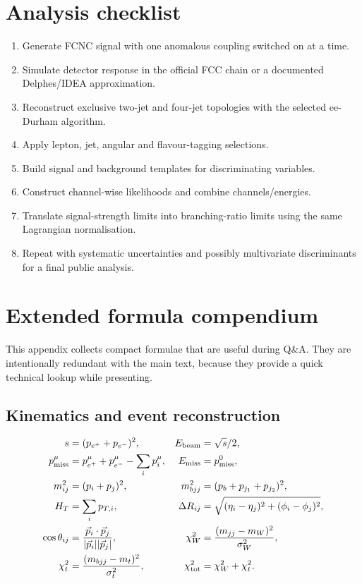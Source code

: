 \documentclass[11pt,a4paper]{report}
\begin{document}
\chapter{Analysis checklist}
\begin{enumerate}
\item Generate FCNC signal with one anomalous coupling switched on at a time.
\item Simulate detector response in the official FCC chain or a documented Delphes/IDEA approximation.
\item Reconstruct exclusive two-jet and four-jet topologies with the selected ee-Durham algorithm.
\item Apply lepton, jet, angular and flavour-tagging selections.
\item Build signal and background templates for discriminating variables.
\item Construct channel-wise likelihoods and combine channels/energies.
\item Translate signal-strength limits into branching-ratio limits using the same Lagrangian normalisation.
\item Repeat with systematic uncertainties and possibly multivariate discriminants for a final public analysis.
\end{enumerate}


\chapter{Extended formula compendium}
This appendix collects compact formulae that are useful during Q\&A.  They are intentionally redundant with the main text, because they provide a quick technical lookup while presenting.
\section{Kinematics and event reconstruction}
\begin{align}
s&=(p_{e^+}+p_{e^-})^2, & E_{\rm beam}&=\sqrt{s}/2,\\
p_{\rm miss}^\mu&=p_{e^+}^\mu+p_{e^-}^\mu-\sum_i p_i^\mu, & E_{\rm miss}&=p_{\rm miss}^0,\\
m_{ij}^2&=(p_i+p_j)^2, & m_{bjj}^2&=(p_b+p_{j_1}+p_{j_2})^2,\\
H_T&=\sum_i p_{T,i}, & \Delta R_{ij}&=\sqrt{(\eta_i-\eta_j)^2+(\phi_i-\phi_j)^2},\\
\cos\theta_{ij}&=\frac{\vec p_i\cdot\vec p_j}{|\vec p_i||\vec p_j|}, & \chi^2_W&=\frac{(m_{jj}-m_W)^2}{\sigma_W^2},\\
\chi^2_t&=\frac{(m_{bjj}-m_t)^2}{\sigma_t^2}, & \chi^2_{\rm tot}&=\chi^2_W+\chi^2_t.
\end{align}
\end{document}
